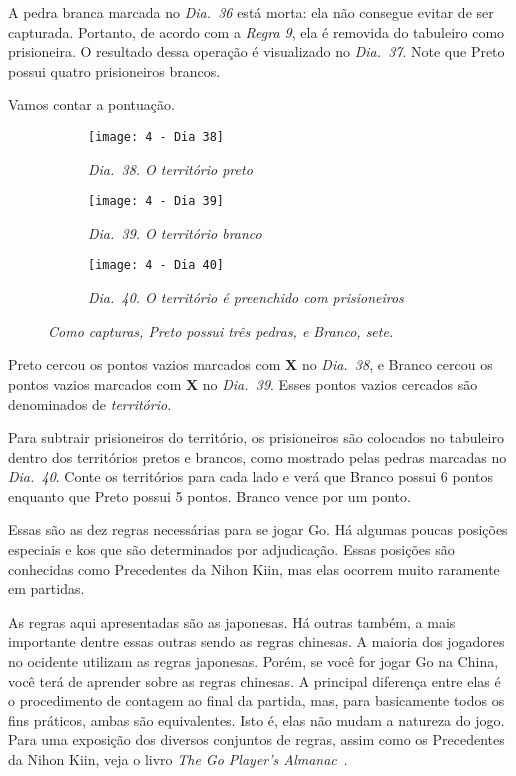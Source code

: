A pedra branca marcada no \emph{Dia.\@~36} está morta: ela não consegue evitar de ser capturada. Portanto, de acordo com a \emph{Regra 9}, ela é removida do tabuleiro como prisioneira. O resultado dessa operação é visualizado no \emph{Dia.\@~37}. Note que Preto possui quatro prisioneiros brancos.

Vamos contar a pontuação.

\begin{figure}[h!]
    \centering
    \begin{subfigure}[t]{.3\textwidth}
        \centering
        \texttt{[image: 4 - Dia 38]}
        \caption*{\emph{Dia.\@~38. O território preto}}
    \end{subfigure}
    \hfill
    \begin{subfigure}[t]{.3\textwidth}
        \centering
        \texttt{[image: 4 - Dia 39]}
        \caption*{\emph{Dia.\@~39. O território branco}}
    \end{subfigure}
    \hfill
    \begin{subfigure}[t]{.3\textwidth}
        \centering
        \texttt{[image: 4 - Dia 40]}
        \caption*{\emph{Dia.\@~40. O território é preenchido com prisioneiros}}
    \end{subfigure}
    \caption*{\emph{Como capturas, Preto possui três pedras, e Branco, sete.}}
\end{figure}

Preto cercou os pontos vazios marcados com \textbf{X} no \emph{Dia.\@~38}, e Branco cercou os pontos vazios marcados com \textbf{X} no \emph{Dia.\@~39}. Esses pontos vazios cercados são denominados de \emph{território}.

Para subtrair prisioneiros do território, os prisioneiros são colocados no tabuleiro dentro dos territórios pretos e brancos, como mostrado pelas pedras marcadas no \emph{Dia.\@~40}. Conte os territórios para cada lado e verá que Branco possui 6 pontos enquanto que Preto possui 5 pontos. Branco vence por um ponto.

Essas são as dez regras necessárias para se jogar Go. Há algumas poucas posições especiais e kos que são determinados por adjudicação. Essas posições são conhecidas como Precedentes da Nihon Kiin, mas elas ocorrem muito raramente em partidas.

As regras aqui apresentadas são as japonesas. Há outras também, a mais importante dentre essas outras sendo as regras chinesas. A maioria dos jogadores no ocidente utilizam as regras japonesas. Porém, se você for jogar Go na China, você terá de aprender sobre as regras chinesas. A principal diferença entre elas é o procedimento de contagem ao final da partida, mas, para basicamente todos os fins práticos, ambas são equivalentes. Isto é, elas não mudam a natureza do jogo. Para uma exposição dos diversos conjuntos de regras, assim como os Precedentes da Nihon Kiin, veja o livro \emph{The Go Player's Almanac}~\cite{bozulich_almanac}.